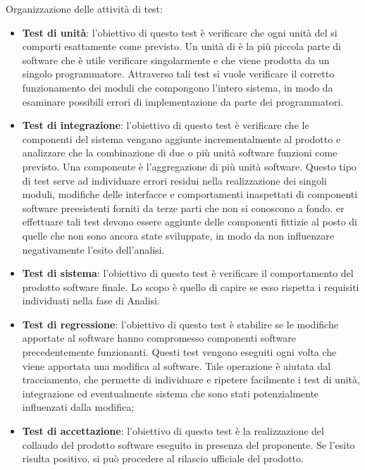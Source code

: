     
    Organizzazione delle attività di test:
    \begin{itemize}
      \item \textbf{Test di unità}: l'obiettivo di questo test è verificare che ogni unità del  si comporti esattamente come previsto. Un unità di  è la più piccola parte di software che è utile verificare singolarmente e che viene prodotta da un singolo programmatore. Attraverso tali test si vuole verificare il corretto funzionamento dei moduli che compongono l'intero sistema, in modo da esaminare possibili errori di implementazione da parte dei programmatori.

      \item \textbf{Test di integrazione}: l'obiettivo di questo test è verificare che le componenti del sistema vengano aggiunte incrementalmente al prodotto e analizzare che la combinazione di due o più unità software funzioni come previsto. Una componente è l'aggregazione di più unità software.
Questo tipo di test serve ad individuare errori residui nella realizzazione dei singoli moduli, modifiche delle interfacce e comportamenti inaspettati di componenti software preesistenti forniti da terze parti che non si conoscono a fondo.  
er effettuare tali test devono essere aggiunte delle componenti fittizie al posto di quelle che non sono ancora state sviluppate, in modo da non influenzare negativamente l'esito dell'analisi.    

      \item \textbf{Test di sistema}: l'obiettivo di questo test è verificare il comportamento del prodotto software finale. Lo scopo è quello di capire se esso rispetta i requisiti individuati nella fase di Analisi.
      
      \item \textbf{Test di regressione}: l'obiettivo di questo test è stabilire se le modifiche apportate al software hanno compromesso componenti software precedentemente funzionanti.
      Questi test vengono eseguiti ogni volta che viene apportata una modifica al software.
      Tale operazione è aiutata dal tracciamento, che permette di individuare e ripetere facilmente i test di unità, integrazione ed eventualmente sistema che sono stati potenzialmente influenzati dalla modifica;
      \item \textbf{Test di accettazione}: l'obiettivo di questo test è la realizzazione del collaudo del prodotto software eseguito in presenza del proponente. Se l'esito risulta positivo, si può procedere al rilascio ufficiale del prodotto.
    \end{itemize}
    
